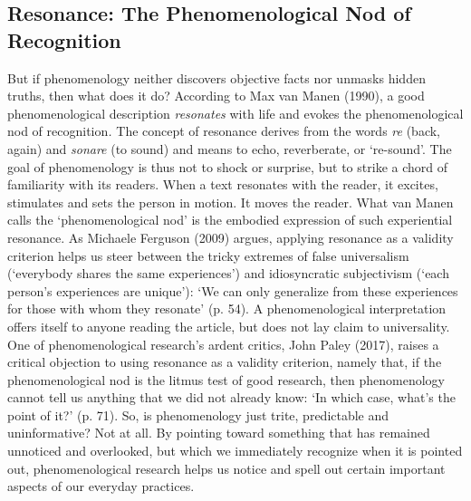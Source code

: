 \begin{adjmulticols}{2}{0mm}{0mm}
\chapter{Resonance: The Phenomenological Nod of Recognition}
But if phenomenology neither discovers objective facts nor unmasks hidden truths, then what does it do? According to Max van Manen (1990), a good phenomenological description \textit{resonates} with life and evokes the phenomenological nod of recognition\textit{.} The concept of resonance derives from the words \textit{re} (back, again) and \textit{sonare} (to sound) and means to echo, reverberate, or ‘re-sound’. The goal of phenomenology is thus not to shock or surprise, but to strike a chord of familiarity with its readers. When a text resonates with the reader, it excites, stimulates and sets the person in motion. It moves the reader. What van Manen calls the ‘phenomenological nod’ is the embodied expression of such experiential resonance. As Michaele Ferguson (2009) argues, applying resonance as a validity criterion helps us steer between the tricky extremes of false universalism (‘everybody shares the same experiences’) and idiosyncratic subjectivism (‘each person’s experiences are unique’): ‘We can only generalize from these experiences for those with whom they resonate’ (p. 54). A phenomenological interpretation offers itself to anyone reading the article, but does not lay claim to universality. One of phenomenological research’s ardent critics, John Paley (2017), raises a critical objection to using resonance as a validity criterion, namely that, if the phenomenological nod is the litmus test of good research, then phenomenology cannot tell us anything that we did not already know: ‘In which case, what’s the point of it?’ (p. 71). So, is phenomenology just trite, predictable and uninformative? Not at all. By pointing toward something that has remained unnoticed and overlooked, but which we immediately recognize when it is pointed out, phenomenological research helps us notice and spell out certain important aspects of our everyday practices. 


\end{adjmulticols}
